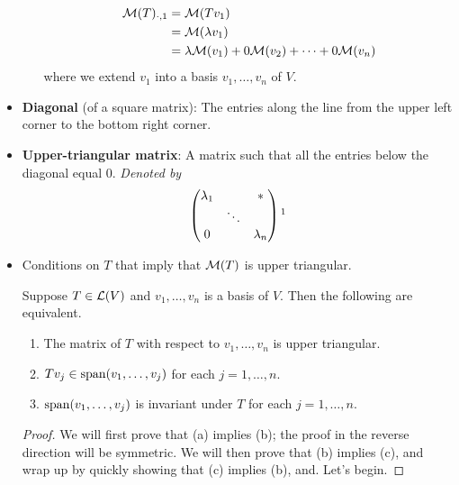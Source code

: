 \documentclass[../main.tex]{subfiles}
\begin{document}
\begin{itemize}
\begin{itemize}
        \begin{align*}
            \mathcal{M}(T)_{\cdot,1} &= \mathcal{M}(Tv_1)\\
            &= \mathcal{M}(\lambda v_1)\\
            &= \lambda\mathcal{M}(v_1)+0\mathcal{M}(v_2)+\cdots+0\mathcal{M}(v_n)
        \end{align*}
        where we extend $v_1$ into a basis $v_1,\dots,v_n$ of $V$.
    \end{itemize}
    \item \textbf{Diagonal} (of a square matrix): The entries along the line from the upper left corner to the bottom right corner.
    \item \textbf{Upper-triangular matrix}: A matrix such that all the entries below the diagonal equal 0. \emph{Denoted by}
    \begin{equation*}
        \begin{pmatrix}
            \lambda_1 &  & *\\
             & \ddots & \\
            0 &  & \lambda_n\\
        \end{pmatrix}\footnotemark
    \end{equation*}
    \item {}Conditions on $T$ that imply that $\mathcal{M}(T)$ is upper triangular.
    \begin{theorem}\label{trm:upperTriangularConditions}
        Suppose $T\in\mathcal{L}(V)$ and $v_1,\dots,v_n$ is a basis of $V$. Then the following are equivalent.
        \begin{enumerate}[label={\textup{(}\alph*\textup{)}}]
            \item The matrix of $T$ with respect to $v_1,\dots,v_n$ is upper triangular.
            \item $Tv_j\in\operatorname{span}(v_1,\dots,v_j)$ for each $j=1,\dots,n$.
            \item $\operatorname{span}(v_1,\dots,v_j)$ is invariant under $T$ for each $j=1,\dots,n$.
        \end{enumerate}
        \begin{proof}
            We will first prove that (a) implies (b); the proof in the reverse direction will be symmetric. We will then prove that (b) implies (c), and wrap up by quickly showing that (c) implies (b), and. Let's begin.\par

\end{proof}
\end{theorem}
\end{itemize}
\end{document}
